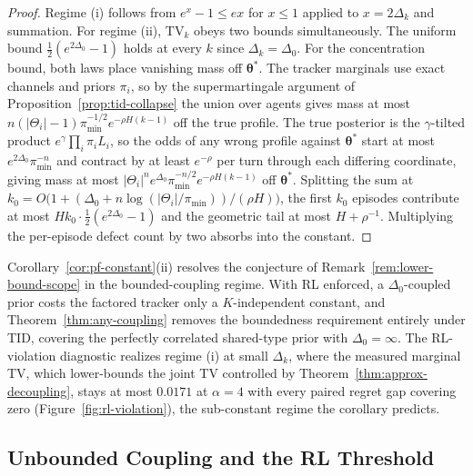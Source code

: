 \begin{proof}
Regime (i) follows from $e^{x}-1\le ex$ for $x\le1$ applied to $x=2\Delta_k$ and summation. For regime (ii), $\mathrm{TV}_k$ obeys two bounds simultaneously. The uniform bound $\tfrac12(e^{2\Delta_0}-1)$ holds at every $k$ since $\Delta_k=\Delta_0$. For the concentration bound, both laws place vanishing mass off $\boldsymbol\theta^*$. The tracker marginals use exact channels and priors $\pi_i$, so by the supermartingale argument of Proposition~\ref{prop:tid-collapse} the union over agents gives mass at most $n(|\Theta_i|-1)\pi_{\min}^{-1/2}e^{-\rho H(k-1)}$ off the true profile. The true posterior is the $\gamma$-tilted product $e^{\gamma}\prod_i\pi_iL_i$, so the odds of any wrong profile against $\boldsymbol\theta^*$ start at most $e^{2\Delta_0}\pi_{\min}^{-n}$ and contract by at least $e^{-\rho}$ per turn through each differing coordinate, giving mass at most $|\Theta_i|^n e^{\Delta_0}\pi_{\min}^{-n/2}e^{-\rho H(k-1)}$ off $\boldsymbol\theta^*$. Splitting the sum at $k_0=O\big(1+(\Delta_0+n\log(|\Theta_i|/\pi_{\min}))/(\rho H)\big)$, the first $k_0$ episodes contribute at most $H k_0\cdot\tfrac12(e^{2\Delta_0}-1)$ and the geometric tail at most $H+\rho^{-1}$. Multiplying the per-episode defect count by two absorbs into the constant.
\end{proof}

\begin{remark}
\label{rem:approx-scope}
Corollary~\ref{cor:pf-constant}(ii) resolves the conjecture of Remark~\ref{rem:lower-bound-scope} in the bounded-coupling regime. With RL enforced, a $\Delta_0$-coupled prior costs the factored tracker only a $K$-independent constant, and Theorem~\ref{thm:any-coupling} removes the boundedness requirement entirely under TID, covering the perfectly correlated shared-type prior with $\Delta_0=\infty$. The RL-violation diagnostic realizes regime (i) at small $\Delta_k$, where the measured marginal TV, which lower-bounds the joint TV controlled by Theorem~\ref{thm:approx-decoupling}, stays at most $0.0171$ at $\alpha=4$ with every paired regret gap covering zero (Figure~\ref{fig:rl-violation}), the sub-constant regime the corollary predicts.
\end{remark}

\subsection{Unbounded Coupling and the RL Threshold}
\label{app:unbounded-coupling}

